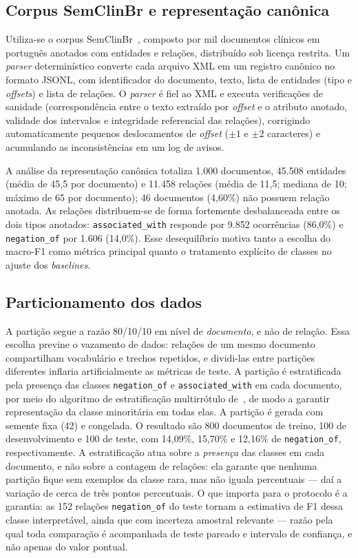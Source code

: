 \documentclass[12pt]{article}
\begin{document}
\subsection{Corpus SemClinBr e representação canônica}
Utiliza-se o corpus SemClinBr~\cite{oliveira:22}, composto por mil documentos
clínicos em português anotados com entidades e relações, distribuído sob licença
restrita. Um \emph{parser} determinístico converte cada arquivo XML em um
registro canônico no formato JSONL, com identificador do documento, texto, lista
de entidades (tipo e \emph{offsets}) e lista de relações. O \emph{parser} é fiel
ao XML e executa verificações de sanidade (correspondência entre o texto
extraído por \emph{offset} e o atributo anotado, validade dos intervalos e
integridade referencial das relações), corrigindo automaticamente pequenos
deslocamentos de \emph{offset} ($\pm1$ e $\pm2$ caracteres) e acumulando as
inconsistências em um log de avisos.

A análise da representação canônica totaliza 1.000 documentos, 45.508 entidades
(média de 45,5 por documento) e 11.458 relações (média de 11,5; mediana de 10;
máximo de 65 por documento); 46 documentos (4,60\%) não possuem relação anotada.
As relações distribuem-se de forma fortemente desbalanceada entre os dois tipos
anotados: \texttt{associated\_with} responde por 9.852 ocorrências (86,0\%) e
\texttt{negation\_of} por 1.606 (14,0\%). Esse desequilíbrio motiva tanto a
escolha do macro-F1 como métrica principal quanto o tratamento explícito de
classes no ajuste dos \emph{baselines}.

\subsection{Particionamento dos dados}
A partição segue a razão 80/10/10 em nível de \emph{documento}, e não de relação.
Essa escolha previne o vazamento de dados: relações de um mesmo documento
compartilham vocabulário e trechos repetidos, e dividi-las entre partições
diferentes inflaria artificialmente as métricas de teste. A partição é
estratificada pela presença das classes \texttt{negation\_of} e
\texttt{associated\_with} em cada documento, por meio do algoritmo de
estratificação multirrótulo de~\cite{sechidis:11}, de modo a garantir
representação da classe minoritária em todas elas. A partição é gerada com
semente fixa (42) e congelada. O resultado são 800 documentos de treino, 100 de
desenvolvimento e 100 de teste, com 14,09\%, 15,70\% e 12,16\% de
\texttt{negation\_of}, respectivamente. A estratificação atua sobre a
\emph{presença} das classes em cada documento, e não sobre a contagem de
relações: ela garante que nenhuma partição fique sem exemplos da classe rara, mas
não iguala percentuais --- daí a variação de cerca de três pontos percentuais. O
que importa para o protocolo é a garantia: as 152 relações \texttt{negation\_of}
do teste tornam a estimativa de F1 dessa classe interpretável, ainda que com
incerteza amostral relevante --- razão pela qual toda comparação é acompanhada de
teste pareado e intervalo de confiança, e não apenas do valor pontual.
\end{document}
